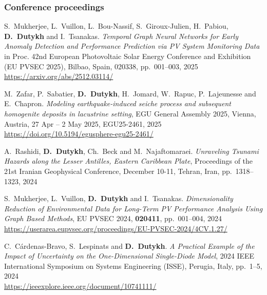 \documentclass[final, a4paper, oneside, 12pt]{article}
\numberwithin{equation}{section}
\begin{document}
\subsubsection{Conference proceedings}

\begin{etaremune}



  \item S.~Mukherjee, L.~Vuillon, L.~Bou-Nassif, S.~Giroux-Julien, H.~Pabiou, \textbf{D.~Dutykh} and I.~Tsanakas. \textit{Temporal Graph Neural Networks for Early Anomaly Detection and Performance Prediction via PV System Monitoring Data} in Proc. 42nd European Photovoltaic Solar Energy Conference and Exhibition (EU PVSEC 2025), Bilbao, Spain, 020338, pp.~001--003, 2025 \\
  \url{https://arxiv.org/abs/2512.03114/}

  \item M.~Zafar, P.~Sabatier, \textbf{D.~Dutykh}, H.~Jomard, W.~Rapuc, P.~Lajeunesse and E.~Chapron. \textit{Modeling earthquake-induced seiche process and subsequent homogenite deposits in lacustrine setting}, EGU General Assembly 2025, Vienna, Austria, 27 Apr -- 2 May 2025, EGU25-2461, 2025 \\
  \url{https://doi.org/10.5194/egusphere-egu25-2461/}
  


  \item A.~Rashidi, \textbf{D.~Dutykh}, Ch.~Beck and M.~Najaftomaraei. \textit{Unraveling Tsunami Hazards along the Lesser Antilles, Eastern Caribbean Plate}, Proceedings of the 21st Iranian Geophysical Conference, December 10-11, Tehran, Iran, pp.~1318--1323, 2024 %

  \item S.~Mukherjee, L.~Vuillon, \textbf{D.~Dutykh} and I.~Tsanakas. \textit{Dimensionality Reduction of Environmental Data for Long-Term PV Performance Analysis Using Graph Based Methods}, EU PVSEC 2024, \textbf{020411}, pp.~001--004, 2024 \\
  \url{https://userarea.eupvsec.org/proceedings/EU-PVSEC-2024/4CV.1.27/}

  \item C.~C\'ardenas-Bravo, S.~Lespinats and \textbf{D.~Dutykh}. \textit{A Practical Example of the Impact of Uncertainty on the One-Dimensional Single-Diode Model}, 2024 IEEE International Symposium on Systems Engineering (ISSE), Perugia, Italy, pp.~1--5, 2024 \\
  \url{https://ieeexplore.ieee.org/document/10741111/}


\end{etaremune}
\end{document}
